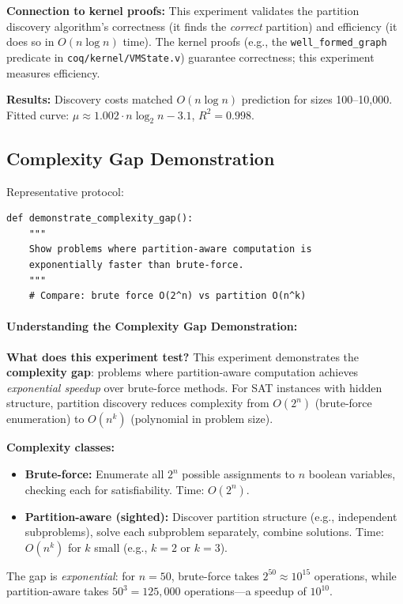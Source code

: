 \textbf{Connection to kernel proofs:} This experiment validates the partition discovery algorithm's correctness (it finds the \textit{correct} partition) and efficiency (it does so in $O(n \log n)$ time). The kernel proofs (e.g., the \texttt{well\_formed\_graph} predicate in \texttt{coq/kernel/VMState.v}) guarantee correctness; this experiment measures efficiency.


\textbf{Results:} Discovery costs matched $O(n \log n)$ prediction for sizes 100--10,000. Fitted curve: $\mu \approx 1.002 \cdot n \log_2 n - 3.1$, $R^2 = 0.998$.

\subsection{Complexity Gap Demonstration}

Representative protocol:
\begin{lstlisting}
def demonstrate_complexity_gap():
    """
    Show problems where partition-aware computation is
    exponentially faster than brute-force.
    """
    # Compare: brute force O(2^n) vs partition O(n^k)
\end{lstlisting}

\paragraph{Understanding the Complexity Gap Demonstration:}

\textbf{What does this experiment test?} This experiment demonstrates the \textbf{complexity gap}: problems where partition-aware computation achieves \textit{exponential speedup} over brute-force methods. For SAT instances with hidden structure, partition discovery reduces complexity from $O(2^n)$ (brute-force enumeration) to $O(n^k)$ (polynomial in problem size).

\textbf{Complexity classes:}
\begin{itemize}
    \item \textbf{Brute-force:} Enumerate all $2^n$ possible assignments to $n$ boolean variables, checking each for satisfiability. Time: $O(2^n)$.
    
    \item \textbf{Partition-aware (sighted):} Discover partition structure (e.g., independent subproblems), solve each subproblem separately, combine solutions. Time: $O(n^k)$ for $k$ small (e.g., $k = 2$ or $k = 3$).
\end{itemize}
The gap is \textit{exponential}: for $n = 50$, brute-force takes $2^{50} \approx 10^{15}$ operations, while partition-aware takes $50^3 = 125,000$ operations---a speedup of $10^{10}$.


